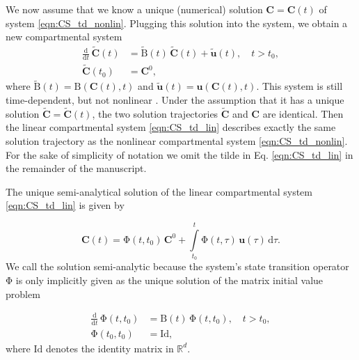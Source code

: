 \documentclass[11pt,a4paper]{article}
\renewcommand{\vec}[1]{\mathbf{#1}}
\newcommand{\tens}[1]{\mathrm{#1}}
\newcommand{\id}{\tens{Id}}
\newcommand{\deriv}[1]{\frac{\mathrm{d}}{\mathrm{d}#1}}
\newcommand{\dd}[1]{\,\mathrm{d}#1}
\newcommand{\intl}{\int\limits}
\newcommand{\R}{\mathbb{R}}
\begin{document}
    We now assume that we know a unique (numerical) solution $\vec{C}=\vec{C}(t)$ of system \eqref{eqn:CS_td_nonlin}.
    Plugging this solution into the system, we obtain a new compartmental system
    \begin{equation}\label{eqn:CS_td_lin}
        \begin{aligned}
            \deriv{t}\,\widetilde{\vec{C}}(t) &= \widetilde{\tens{B}}(t)\,\widetilde{\vec{C}}(t) + \widetilde{\vec{u}}(t),\quad t>t_0,\\
            \widetilde{\vec{C}}(t_0) &= \vec{C}^0,
        \end{aligned}
    \end{equation}
    where $\widetilde{\tens{B}}(t)=\tens{B}(\vec{C}(t),t)$ and $\widetilde{\vec{u}}(t)=\vec{u}(\vec{C}(t),t)$.
    This system is still time-dependent, but not nonlinear .
    Under the assumption that it has a unique solution $\widetilde{\vec{C}}=\widetilde{\vec{C}}(t)$, the two solution trajectories $\widetilde{\vec{C}}$ and $\vec{C}$ are identical.
    Then the linear compartmental system \eqref{eqn:CS_td_lin} describes exactly the same solution trajectory as the nonlinear compartmental system \eqref{eqn:CS_td_nonlin}.
    For the sake of simplicity of notation we omit the tilde in Eq. \eqref{eqn:CS_td_lin} in the remainder of the manuscript.
    
    The unique semi-analytical solution of the linear compartmental system \eqref{eqn:CS_td_lin} is given by \citep{Brockett2015}
    
    \begin{equation*}
        \vec{C}(t) = \tens{\Phi}(t,t_0)\,\vec{C}^0 + \intl_{t_0}^t \tens{\Phi}(t,\tau)\,\vec{u}(\tau)\dd{\tau}.
    \end{equation*}
    We call the solution semi-analytic because the system's state transition operator $\tens{\Phi}$ is only implicitly given as the unique solution of the matrix initial value problem
    
    \begin{equation*}
        \begin{aligned}
            \deriv{t}\,\tens{\Phi}(t,t_0) &= \tens{B}(t)\,\tens{\Phi}(t,t_0),\quad t>t_0,\\
            \tens{\Phi}(t_0,t_0) &= \id,
        \end{aligned}
    \end{equation*}
    where $\id$ denotes the identity matrix in $\R^d$. 
\end{document}
